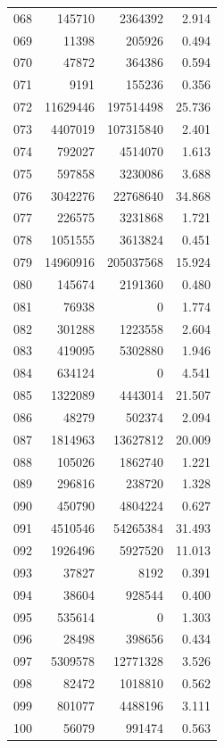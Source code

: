 \documentclass[anonymous,notoc]{gmcm2026}
\begin{document}
\begin{longtable}{lrrr}
068 & 145710 & 2364392 & 2.914 \\
069 & 11398 & 205926 & 0.494 \\
070 & 47872 & 364386 & 0.594 \\
071 & 9191 & 155236 & 0.356 \\
072 & 11629446 & 197514498 & 25.736 \\
073 & 4407019 & 107315840 & 2.401 \\
074 & 792027 & 4514070 & 1.613 \\
075 & 597858 & 3230086 & 3.688 \\
076 & 3042276 & 22768640 & 34.868 \\
077 & 226575 & 3231868 & 1.721 \\
078 & 1051555 & 3613824 & 0.451 \\
079 & 14960916 & 205037568 & 15.924 \\
080 & 145674 & 2191360 & 0.480 \\
081 & 76938 & 0 & 1.774 \\
082 & 301288 & 1223558 & 2.604 \\
083 & 419095 & 5302880 & 1.946 \\
084 & 634124 & 0 & 4.541 \\
085 & 1322089 & 4443014 & 21.507 \\
086 & 48279 & 502374 & 2.094 \\
087 & 1814963 & 13627812 & 20.009 \\
088 & 105026 & 1862740 & 1.221 \\
089 & 296816 & 238720 & 1.328 \\
090 & 450790 & 4804224 & 0.627 \\
091 & 4510546 & 54265384 & 31.493 \\
092 & 1926496 & 5927520 & 11.013 \\
093 & 37827 & 8192 & 0.391 \\
094 & 38604 & 928544 & 0.400 \\
095 & 535614 & 0 & 1.303 \\
096 & 28498 & 398656 & 0.434 \\
097 & 5309578 & 12771328 & 3.526 \\
098 & 82472 & 1018810 & 0.562 \\
099 & 801077 & 4488196 & 3.111 \\
100 & 56079 & 991474 & 0.563 \\
\end{longtable}
\end{document}
